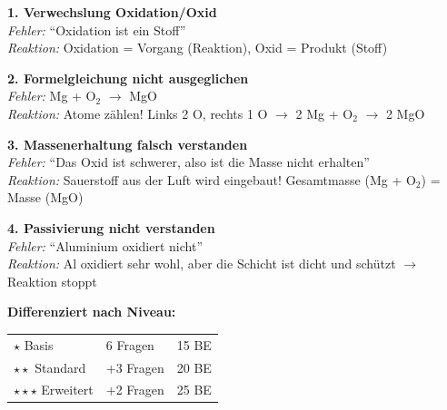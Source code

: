 \documentclass[11pt, a4paper]{article}
\newcommand{\abschnitt}[1]{%
    \vspace{10pt}%
    \noindent{\large\bfseries\textcolor{fachfarbe}{#1}}%
    \vspace{6pt}%
    \nopagebreak[4]%
}
\begin{document}

\abschnitt{Häufige Fehler und Reaktionen}

\begin{warnbox}
\textbf{1. Verwechslung Oxidation/Oxid}\\
\textit{Fehler:} ``Oxidation ist ein Stoff''\\
\textit{Reaktion:} Oxidation = Vorgang (Reaktion), Oxid = Produkt (Stoff)

\vspace{6pt}

\textbf{2. Formelgleichung nicht ausgeglichen}\\
\textit{Fehler:} Mg + O$_2$ $\rightarrow$ MgO\\
\textit{Reaktion:} Atome zählen! Links 2 O, rechts 1 O $\rightarrow$ 2 Mg + O$_2$ $\rightarrow$ 2 MgO

\vspace{6pt}

\textbf{3. Massenerhaltung falsch verstanden}\\
\textit{Fehler:} ``Das Oxid ist schwerer, also ist die Masse nicht erhalten''\\
\textit{Reaktion:} Sauerstoff aus der Luft wird eingebaut! Gesamtmasse (Mg + O$_2$) = Masse (MgO)

\vspace{6pt}

\textbf{4. Passivierung nicht verstanden}\\
\textit{Fehler:} ``Aluminium oxidiert nicht''\\
\textit{Reaktion:} Al oxidiert sehr wohl, aber die Schicht ist dicht und schützt $\rightarrow$ Reaktion stoppt
\end{warnbox}


\abschnitt{Stundenleistung (MT)}

\begin{infobox}
\textbf{Differenziert nach Niveau:}\\[0.3em]
\begin{tabular}{lll}
$\star$ Basis & 6 Fragen & 15 BE \\
$\star\star$ Standard & +3 Fragen & 20 BE \\
$\star\star\star$ Erweitert & +2 Fragen & 25 BE
\end{tabular}
\end{infobox}
\end{document}
